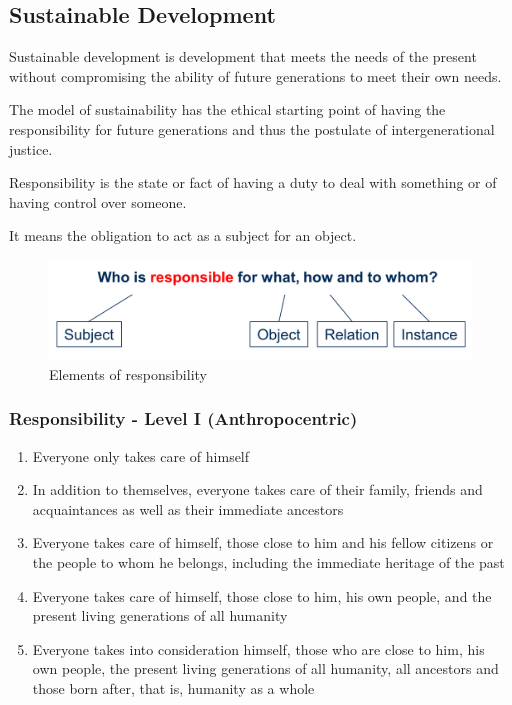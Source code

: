 \documentclass[11pt]{article}
\theoremstyle{definition}
\begin{document}
\subsection{Sustainable Development}
\begin{definition}
	Sustainable development is development that meets the needs of the present without compromising the ability of future generations to meet their own needs.
\end{definition}
The model of sustainability has the ethical starting point of having the responsibility for future generations and thus the postulate of intergenerational justice.
\begin{definition}
	Responsibility is the state or fact of having a duty to deal with something or of having control over someone.
\end{definition}
It means the obligation to act as a subject for an object. \parencite{gobel2013unternehmensethik}

\begin{figure}[tbh]
	\centering
	\includegraphics[width=0.6\linewidth]{img/responsibility}
	\caption{Elements of responsibility}
	\label{fig:responsibility}
\end{figure}

\subsubsection{Responsibility - Level I (Anthropocentric)}
\begin{enumerate}
	\item Everyone only takes care of himself
	\item In addition to themselves, everyone takes care of their family, friends and acquaintances as well as their immediate ancestors
	\item Everyone takes care of himself, those close to him and his fellow citizens or the people to whom he belongs, including the immediate heritage of the past
	\item Everyone takes care of himself, those close to him, his own people, and the present living generations of all humanity
	\item Everyone takes into consideration himself, those who are close to him, his own people, the present living generations of all humanity, all ancestors and those born after, that is, humanity as a whole
\end{enumerate}
\end{document}
